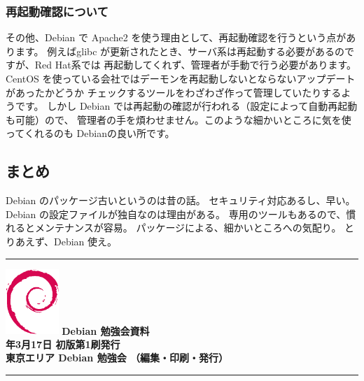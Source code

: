 \documentclass[mingoth,a4paper]{jsarticle}
\newcommand{\debmtgyear}{2012}
\newcommand{\debmtgmonth}{3}
\newcommand{\debmtgdate}{17}
\begin{document}
\subsubsection{再起動確認について}
その他、Debian で Apache2 を使う理由として、再起動確認を行うという点があります。
例えばglibc が更新されたとき、サーバ系は再起動する必要があるのですが、Red Hat系では
再起動してくれず、管理者が手動で行う必要があります。
CentOS を使っている会社ではデーモンを再起動しないとならないアップデートがあったかどうか
チェックするツールをわざわざ作って管理していたりするようです。
しかし Debian では再起動の確認が行われる（設定によって自動再起動も可能）ので、
管理者の手を煩わせません。このような細かいところに気を使ってくれるのも Debianの良い所です。

\subsection{まとめ}

Debian のパッケージ古いというのは昔の話。
セキュリティ対応あるし、早い。
Debian の設定ファイルが独自なのは理由がある。
専用のツールもあるので、慣れるとメンテナンスが容易。
パッケージによる、細かいところへの気配り。
とりあえず、Debian 使え。

\printindex

\cleartooddpage

\vspace*{15cm}
\hrule
\vspace{2mm}
\includegraphics[width=2cm]{image200502/openlogo-nd.eps}
\noindent \Large \bf Debian 勉強会資料\\
\noindent \normalfont \debmtgyear{}年\debmtgmonth{}月\debmtgdate{}日 \hspace{5mm}  初版第1刷発行\\
\noindent \normalfont 東京エリア Debian 勉強会 （編集・印刷・発行）\\
\hrule
\end{document}
